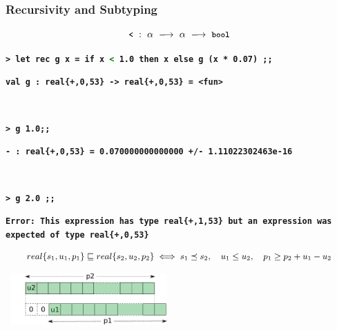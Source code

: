 \documentclass[handout,t]{beamer}
\def\mytt#1{\texttt{\textbf{#1}}}
\def\real#1{real\{#1\}}
\begin{document}
\begin{frame}
\frametitle{Recursivity and Subtyping}


$$\small
\mytt{<}\ :\ \alpha\ \longrightarrow\ \alpha\ \longrightarrow\ \mytt{bool}
$$

\scriptsize
\color{blue}

\vspace{0.1cm}


\mytt{> let rec g x = if x \textcolor{green}{<} 1.0 then x else g (x * 0.07) ;;}

\mytt{\color{red}val g : \real{+,0,53} -> \real{+,0,53} = <fun>}

\mytt{\ }

\mytt{> g 1.0;;}

\mytt{\color{red}- : \real{+,0,53} =  0.070000000000000 +/- 1.11022302463e-16}

\mytt{\ }

\mytt{> g 2.0 ;;}

\mytt{\color{red}Error: This expression has type \real{+,1,53} but an expression was expected of type \real{+,0,53}}

\normalsize
\color{black}



$$\small
\begin{array}{c}
\real{s_1,u_1,p_1} \sqsubseteq \real{s_2,u_2,p_2} 
\iff
s_1 \preceq s_2,\quad
u_1 \le u_2,\quad
p_1 \ge p_2 + u_1 - u_2
\end{array}
$$

\vspace{0.1cm}

~\hfill\includegraphics[width=6cm]{lttype.pdf}

\end{frame}
\end{document}

